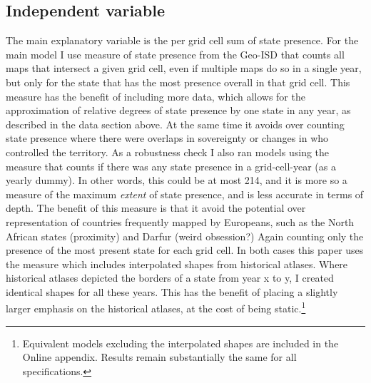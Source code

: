 \documentclass[12pt]{article}
\begin{document}


\subsection{Independent variable}

The main explanatory variable is the per grid cell sum of state presence. For
the main model I use measure of state presence from the Geo-ISD that counts all
maps that intersect a given grid cell, even if multiple maps do so in a single
year, but only for the state that has the most presence overall in that grid
cell. This measure has the benefit of including more data, which allows for the
approximation of relative degrees of state presence by one state in any year, as
described in the data section above. At the same time it avoids over counting
state presence where there were overlaps in sovereignty or changes in who
controlled the territory. As a robustness check I also ran models using the
measure that counts if there was any state presence in a grid-cell-year (as a
yearly dummy). In other words, this could be at most 214, and it is more so a
measure of the maximum \textit{extent} of state presence, and is less accurate
in terms of depth. The benefit of this measure is that it avoid the potential
over representation of countries frequently mapped by Europeans, such as the
North African states (proximity) and Darfur (weird obsession?) Again counting
only the presence of the most present state for each grid cell. In both cases
this paper uses the measure which includes interpolated shapes from historical
atlases. Where historical atlases depicted the borders of a state from year x to
y, I created identical shapes for all these years. This has the benefit of
placing a slightly larger emphasis on the historical atlases, at the cost of
being static.\footnote{Equivalent models excluding the interpolated shapes are
included in the Online appendix. Results remain substantially the same for all
specifications.}
\end{document}
